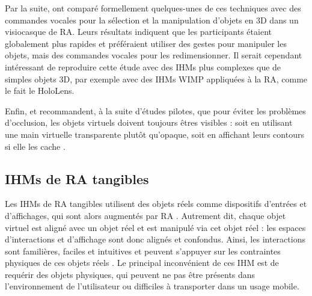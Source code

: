 Par la suite, \cite{Piumsomboon2014} ont comparé formellement quelques-unes de ces techniques avec des commandes vocales pour la sélection et la manipulation d'objets en 3D dans un visiocasque de RA. Leurs résultats indiquent que les participants étaient globalement plus rapides et préféraient utiliser des gestes pour manipuler les objets, mais des commandes vocales pour les redimensionner. Il serait cependant intéressant de reproduire cette étude avec des IHMs plus complexes que de simples objets 3D, par exemple avec des IHMs WIMP appliquées à la RA, comme le fait le HoloLens.


Enfin, \cite{Piumsomboon2013} et \cite{Piumsomboon2014} recommandent, à la suite d'études pilotes, que pour éviter les problèmes d'occlusion, les objets virtuels doivent toujours êtres visibles : soit en utilisant une main virtuelle transparente plutôt qu'opaque, soit en affichant leurs contours si elle les cache .


\subsection{IHMs de RA tangibles}
\label{subsec:litterature_ar_hci_tui}

Les IHMs de RA tangibles utilisent des objets réels comme dispositifs d'entrées et d'affichages, qui sont alors augmentés par RA \citep{Kato2000}. Autrement dit, chaque objet virtuel est aligné avec un objet réel et est manipulé via cet objet réel \citep{Billinghurst2005} : les espaces d'interactions et d'affichage sont donc alignés et confondus. Ainsi, les interactions sont familières, faciles et intuitives et peuvent s'appuyer sur les contraintes physiques de ces objets réels \citep{Zhou2008}. Le principal inconvénient de ces IHM est de requérir des objets physiques, qui peuvent ne pas être présents dans l'environnement de l'utilisateur ou difficiles à transporter dans un usage mobile.

